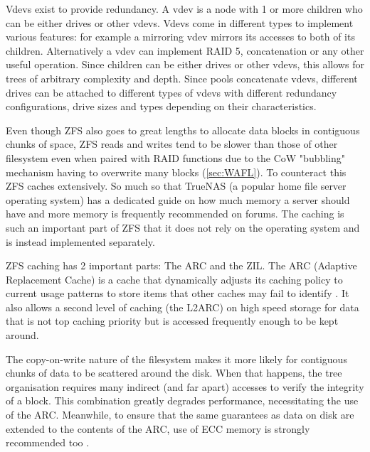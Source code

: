             Vdevs exist to provide redundancy. A vdev is a node with 1 or more
            children who can be either drives or other vdevs. Vdevs come
            in different types to implement various features: for example a
            mirroring vdev mirrors its accesses to both of its children. Alternatively
            a vdev can implement RAID 5, concatenation or any other useful
            operation. Since children can be either drives or other vdevs,
            this allows for trees of arbitrary complexity and depth.
            Since pools concatenate vdevs, different drives can be attached to
            different types of vdevs with different redundancy configurations,
            drive sizes and types depending on their characteristics.

            Even though ZFS also goes to great lengths to allocate data blocks
            in contiguous chunks of space, ZFS reads and writes tend to be
            slower than those of other filesystem even when paired with RAID
            functions due to the CoW "bubbling" mechanism having to overwrite
            many blocks \cite{ZFS} (\autoref{sec:WAFL}). To counteract this ZFS
            caches extensively. So much so that TrueNAS (a popular home file
            server operating system) has a dedicated guide on how much memory a
            server should have \cite{TrueNAS_hardware_guide} and more memory is
            frequently recommended on forums. The caching is such an important
            part of ZFS that it does not rely on the operating system and is
            instead implemented separately.

            ZFS caching has 2 important parts: The ARC and the ZIL. The ARC
            (Adaptive Replacement Cache) is a cache that dynamically adjusts
            its caching policy to current usage patterns to store items that
            other caches may fail to identify \cite{ARC}. It also allows a
            second level of caching (the L2ARC) on high speed storage for data
            that is not top caching priority but is accessed frequently enough
            to be kept around.

            The copy-on-write nature of the filesystem makes it more likely for
            contiguous chunks of data to be scattered around the disk. When that happens, the
            tree organisation requires many indirect (and far apart) accesses
            to verify the integrity of a block. This combination greatly
            degrades performance, necessitating the use of the ARC. Meanwhile,
            to ensure that the same guarantees as data on disk are extended to
            the contents of the ARC, use of ECC memory is strongly recommended too
            \cite{TrueNAS_hardware_guide}.

